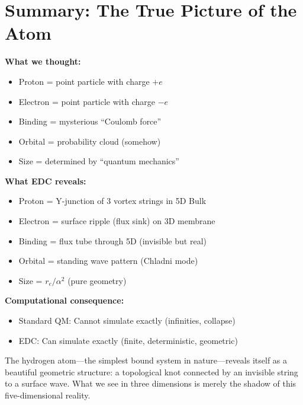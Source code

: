 
\section{Summary: The True Picture of the Atom}
\label{sec:summary}

\begin{tcolorbox}[colback=gray!10,colframe=black,title=\textbf{Chapter Summary}]

\textbf{What we thought:}
\begin{itemize}
    \item Proton = point particle with charge $+e$
    \item Electron = point particle with charge $-e$
    \item Binding = mysterious ``Coulomb force''
    \item Orbital = probability cloud (somehow)
    \item Size = determined by ``quantum mechanics''
\end{itemize}

\textbf{What EDC reveals:}
\begin{itemize}
    \item Proton = Y-junction of 3 vortex strings in 5D Bulk
    \item Electron = surface ripple (flux sink) on 3D membrane
    \item Binding = flux tube through 5D (invisible but real)
    \item Orbital = standing wave pattern (Chladni mode)
    \item Size = $r_e/\alpha^2$ (pure geometry)
\end{itemize}

\textbf{Computational consequence:}
\begin{itemize}
    \item Standard QM: Cannot simulate exactly (infinities, collapse)
    \item EDC: Can simulate exactly (finite, deterministic, geometric)
\end{itemize}

\end{tcolorbox}

\vspace{2em}

The hydrogen atom---the simplest bound system in nature---reveals itself as a beautiful geometric structure: a topological knot connected by an invisible string to a surface wave. What we see in three dimensions is merely the shadow of this five-dimensional reality.

